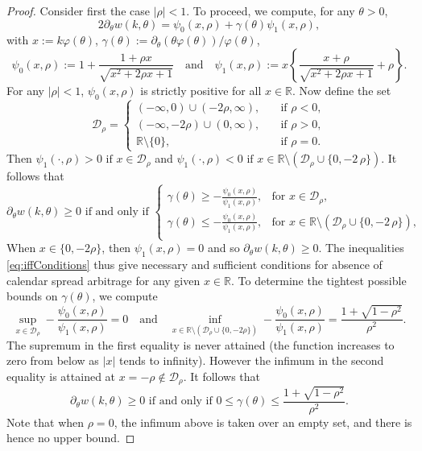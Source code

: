 \documentclass[12pt]{article}
\numberwithin{equation}{section}
\newcommand{\R}{\mathbb{R}}
\newcommand{\Dd}{\mathcal{D}}
\newcommand{\beq}{\begin{equation}}
\newcommand{\eeq}{\end{equation}}
\begin{document}
\begin{proof}
Consider first the case $|\rho|<1$.
To proceed, we compute, for any $\theta>0$,
$$
2\partial_\theta w (k,\theta)=\psi_0(x,\rho)
+\gamma(\theta) \psi_1(x,\rho),
$$
with $x:= k\varphi(\theta)$, $\gamma(\theta) := \partial_\theta(\theta\varphi(\theta))/\varphi(\theta)$,
$$
\psi_0(x,\rho) := 1+\frac{1+\rho x }{\sqrt{x^2+2\rho x +1}}
\quad\text{and}\quad
\psi_1(x,\rho):= x \left\{\frac{x+\rho }{\sqrt{x^2+2\rho x +1}}+\rho \right\}.
$$
For any $|\rho|<1$, $\psi_0(x,\rho)$ is strictly positive for all $x\in\R$.
Now define the set
$$
\Dd_\rho =
\left\{
\begin{array}{ll}
(-\infty,0)\cup (-2\rho,\infty),
\quad & \text{if }\rho<0,\\
(-\infty,-2\rho)\cup (0,\infty),
\quad & \text{if }\rho>0,\\
\R\setminus\{0\},
\quad & \text{if }\rho=0.
\end{array}
\right.
$$
Then 
$\psi_1(\cdot,\rho) >0 \text{ if } x \in \Dd_\rho$
and 
$\psi_1(\cdot,\rho) <0 \text{ if } x \in \R \setminus \left( \Dd_\rho\cup\{0,-2\,\rho\} \right)$.  
It follows that
\beq
\partial_\theta w(k,\theta)\geq 0 \text{ if and only if }
\left\{
\begin{array}{ll}
\displaystyle \gamma(\theta)\geq -\frac{\psi_0(x,\rho)}{\psi_1(x,\rho)}, 
 & \text{for }x\in\Dd_\rho,\\
\displaystyle \gamma(\theta)\leq -\frac{\psi_0(x,\rho)}{\psi_1(x,\rho)}, 
 & \text{for }x\in\R\setminus\left(\Dd_\rho\cup\{0,-2\,\rho\}\right),\\
\end{array}
\right.
\label{eq:iffConditions}
\eeq
When $x\in\{0,-2\rho\}$, then $\psi_1(x,\rho)=0$ and so $\partial_\theta w(k,\theta)\geq 0$.  
The inequalities \eqref{eq:iffConditions} thus give necessary and sufficient conditions 
for absence of calendar spread arbitrage for any given $x \in \R$.
To determine the tightest possible bounds on $\gamma(\theta)$, we compute
$$
\sup_{x\in\Dd_\rho}-\frac{\psi_0(x,\rho)}{\psi_1(x,\rho)} = 0
\quad\text{and}\quad
\inf_{x\in\R\setminus\left(\Dd_\rho\cup\{0,-2\rho\}\right)}-\frac{\psi_0(x,\rho)}{\psi_1(x,\rho)} = 
\frac{1+\sqrt{1-\rho^2}}{\rho^2}.
$$
The supremum in the first equality is never attained (the function increases to zero from below as $|x|$ tends to infinity).  However the infimum in the second equality is attained at $x=-\rho\notin\mathcal{D}_\rho$.  It follows that
$$
\partial_\theta w(k,\theta)\geq 0 \text{ if and only if }
0 \leq  \gamma(\theta)\leq \frac{1+\sqrt{1-\rho^2}}{\rho^2}.
$$
Note that when $\rho=0$, the infimum above is taken over an empty set, and there is hence no upper bound.



\end{proof}
\end{document}
